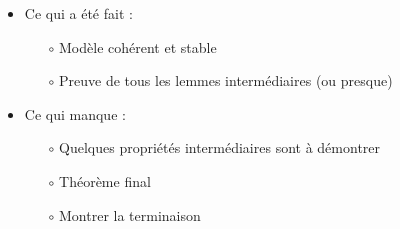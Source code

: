 \documentclass{beamer}
\theoremstyle{definition}
\begin{document}
\begin{frame}
    \begin{itemize}
        \item Ce qui a été fait :
        \begin{itemize}
          \item[$\circ$] Modèle cohérent et stable
          \item[$\circ$] Preuve de tous les lemmes intermédiaires (ou presque)
        \end{itemize}
        \vfill
        \item Ce qui manque :
        \begin{itemize}
          \item[$\circ$] Quelques propriétés intermédiaires sont à démontrer
          \item[$\circ$] Théorème final
          \item[$\circ$] Montrer la terminaison
        \end{itemize}
    \end{itemize}
\end{frame}
\end{document}
